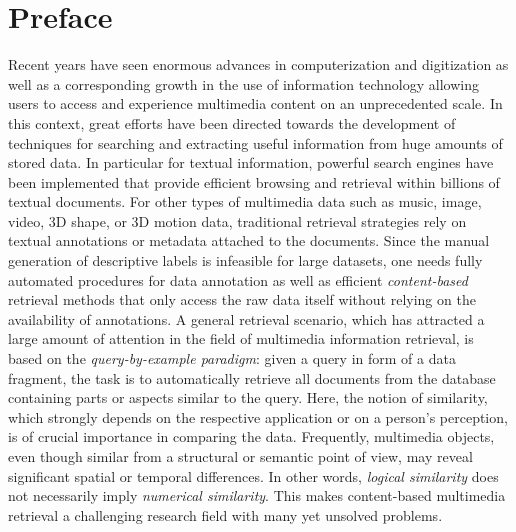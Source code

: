 
\chapter*{Preface}


Recent years have seen enormous advances in computerization and
digitization as well as a corresponding growth in the use of
information technology allowing users to access and
experience multimedia content on an unprecedented scale.
In this context, great efforts have been directed towards the
development of techniques for searching and extracting
useful information from huge amounts of stored data.
In particular for textual information, powerful search
engines have been implemented that provide efficient
browsing and retrieval within billions of textual documents.
For other types of multimedia data such as
music, image, video, 3D shape, or 3D motion data,
traditional retrieval strategies rely on textual annotations
or metadata attached to the documents.
Since the manual generation of %
descriptive labels is
infeasible for large datasets, one needs fully automated procedures
for data annotation as well as efficient
\emph{content-based} retrieval methods that only access the raw data itself
without relying on the availability of annotations.
A general retrieval scenario, which has attracted
a large amount of attention in the field of
multimedia information retrieval, is based on the
\emph{query-by-example paradigm}:
given a query in form of a data fragment, the task is to
automatically retrieve all documents from the database
containing parts or aspects similar to the query.
Here, the notion of similarity, which strongly
depends on the respective application or on a person's perception,
is of crucial importance in comparing the data.
Frequently, multimedia objects, even though similar from
a structural or semantic point of view, may reveal significant
spatial or temporal differences. In other words,
\emph{logical similarity} does not necessarily imply
\emph{numerical similarity}. This makes content-based
multimedia retrieval a challenging research field
with many yet unsolved problems.

